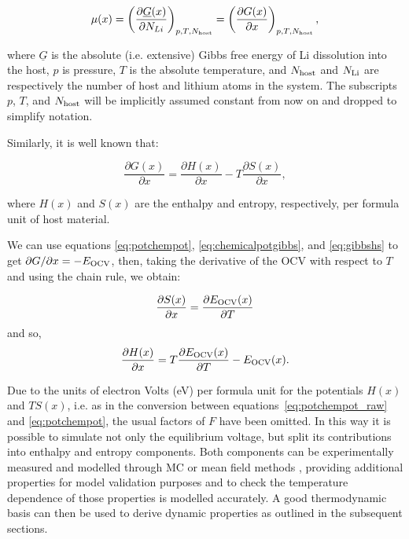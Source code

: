 \documentclass[../main.tex]{subfiles}
\begin{document}
\begin{equation}
    \mu(x) = \left(\frac{\partial{\underline{G}(x)}}{\partial{N_{Li}}}\right)_{p,T,N_{\rm{host}}} = \left(\frac{\partial{G(x)}}{\partial{x}}\right)_{p,T,N_{\rm{host}}},
    \label{eq:chemicalpotgibbs}
\end{equation}

where $\underline{G}$ is the absolute (i.e. extensive) Gibbs free energy of Li dissolution into the host, $p$ is pressure, $T$ is the absolute temperature, and $N_{\rm{host}}$ and $N_{\rm{Li}}$ are respectively the number of host and lithium atoms in the system. The subscripts $p$, $T$, and $N_{\rm{host}}$ will be implicitly assumed constant from now on and dropped to simplify notation.

Similarly, it is well known that:

\begin{equation}
    \frac{\partial{G(x)}}{\partial{x}} = \frac{\partial{H(x)}}{\partial{x}} - T\frac{\partial{S(x)}}{\partial{x}}, 
    \label{eq:gibbshs}
\end{equation}

where $H(x)$ and $S(x)$ are the enthalpy and entropy, respectively, per formula unit of host material.

We can use equations \ref{eq:potchempot}, \ref{eq:chemicalpotgibbs}, and \ref{eq:gibbshs} to get $\partial{G}/\partial{x} = -E_{\rm{OCV}}$, then, taking the derivative of the OCV with respect to $T$ and using the chain rule, we obtain:

\begin{equation}
   \frac{\partial{S(x)}}{\partial{x}} = \frac{\partial{E_{\rm{OCV}}(x)}}{\partial{T}}
    \label{eq:entropy_measurement}
\end{equation}
and so,
\begin{equation}
    \frac{\partial{H(x)}}{\partial{x}} = T\frac{\partial{E_{\rm{OCV}}(x)}}{\partial{T}} - E_{\rm{OCV}}(x).
    \label{eq:enthalpy_measurement}
\end{equation}

Due to the units of electron Volts (eV) per formula unit for the potentials $H(x)$ and $TS(x)$, i.e. as in the conversion between equations~\ref{eq:potchempot_raw} and \ref{eq:potchempot}, the usual factors of $F$ have been omitted. In this way it is possible to simulate not only the equilibrium voltage, but split its contributions into enthalpy and entropy components. Both components can be experimentally measured \cite{schlueter_quantifying_2018, Mercer2019, THOMAS2003844,Reynier2004,Yazami_2006} and modelled through MC or mean field methods \cite{schlueter_quantifying_2018,mercer_influence_2017,Mercer2019,Leiva2017b}, providing additional properties for model validation purposes and to check the temperature dependence of those properties is modelled accurately. A good thermodynamic basis can then be used to derive dynamic properties as outlined in the subsequent sections.
\end{document}
